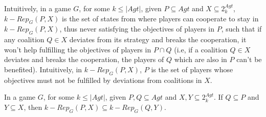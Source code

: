 Intuitively, in a game $G$, for some $k \leq \vert Agt \vert$, given $P \subseteq Agt$ and $X \subseteq 2^{Agt}_{k}$, $k-Rep_{G}(P, X)$ is the set of states from where players can cooperate to stay in $k-Rep_{G}(P, X)$, thus never satisfying the objectives of players in $P$, such that if any coalition $Q \in X$ deviates from its strategy and breaks the cooperation, it won't help fulfilling the objectives of players in $P \cap Q$ (i.e, if a coalition $Q \in X$ deviates and breaks the cooperation, the players of $Q$ which are also in $P$ can't be benefited). Intuitively, in $k-Rep_{G}(P, X)$, $P$ is the set of players whose objectives must not be fulfilled by deviations from coalitions in $X$.

\begin{lemma}
\label{lemma2}
In a game $G$, for some $k \leq \vert Agt \vert$, given $P, Q \subseteq Agt$ and $X, Y \subseteq 2^{Agt}_{k}$. If $Q \subseteq P$ and $Y \subseteq X$, then $k-Rep_{G}(P, X) \subseteq k-Rep_{G}(Q, Y)$.
\end{lemma}

